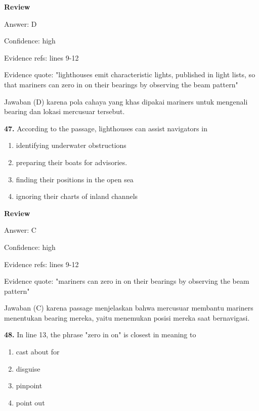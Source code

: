 \documentclass[12pt]{article}
\begin{document}
\par
\begingroup
\setlength{\parskip}{0pt}
\setlength{\parindent}{0pt}
\textbf{Review}\par
Answer: D\par
Confidence: high\par
Evidence refs: lines 9-12\par
Evidence quote: "lighthouses emit characteristic lights, published in light lists, so that mariners can zero in on their bearings by observing the beam pattern"\par
Jawaban (D) karena pola cahaya yang khas dipakai mariners untuk mengenali bearing dan lokasi mercusuar tersebut.\par
\endgroup
\par
\vspace{0.25\baselineskip}
\noindent\textbf{47.} According to the passage, lighthouses can assist navigators in
\begin{enumerate}[label=(\Alph*),leftmargin=*,itemsep=0.2em]
\item identifying underwater obstructions
\item preparing their boats for advisories.
\item finding their positions in the open sea
\item ignoring their charts of inland channels
\end{enumerate}
\par
\begingroup
\setlength{\parskip}{0pt}
\setlength{\parindent}{0pt}
\textbf{Review}\par
Answer: C\par
Confidence: high\par
Evidence refs: lines 9-12\par
Evidence quote: "mariners can zero in on their bearings by observing the beam pattern"\par
Jawaban (C) karena passage menjelaskan bahwa mercusuar membantu mariners menentukan bearing mereka, yaitu menemukan posisi mereka saat bernavigasi.\par
\endgroup
\par
\vspace{0.25\baselineskip}
\noindent\textbf{48.} In line 13, the phrase "zero in on" is closest in meaning to
\begin{enumerate}[label=(\Alph*),leftmargin=*,itemsep=0.2em]
\item cast about for
\item disguise
\item pinpoint
\item point out
\end{enumerate}
\end{document}
